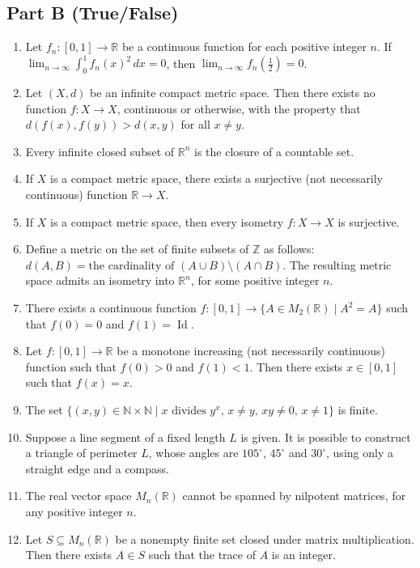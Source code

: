 \documentclass[11pt, a4paper]{article}
\begin{document}
\subsection*{Part B (True/False)}
\begin{enumerate}
  \item Let $f_n: [0,1] \to \mathbb{R}$ be a continuous function for each positive integer $n$. If $\lim_{n \to \infty} \int_0^1 f_n(x)^2\,dx = 0$, then $\lim_{n \to \infty} f_n\left(\frac{1}{2}\right) = 0$.
  \item Let $(X, d)$ be an infinite compact metric space. Then there exists no function $f: X \to X$, continuous or otherwise, with the property that $d(f(x), f(y)) > d(x, y)$ for all $x \ne y$.
  \item Every infinite closed subset of $\mathbb{R}^n$ is the closure of a countable set.
  \item If $X$ is a compact metric space, there exists a surjective (not necessarily continuous) function $\mathbb{R} \to X$.
  \item If $X$ is a compact metric space, then every isometry $f: X \to X$ is surjective.
  \item Define a metric on the set of finite subsets of $\mathbb{Z}$ as follows: $d(A, B) = \text{the cardinality of } (A \cup B) \setminus (A \cap B)$. The resulting metric space admits an isometry into $\mathbb{R}^n$, for some positive integer $n$.
  \item There exists a continuous function $f: [0,1] \to \{A \in M_2(\mathbb{R}) \mid A^2 = A\}$ such that $f(0) = 0$ and $f(1) = \operatorname{Id}$.
  \item Let $f: [0,1] \to \mathbb{R}$ be a monotone increasing (not necessarily continuous) function such that $f(0) > 0$ and $f(1) < 1$. Then there exists $x \in [0,1]$ such that $f(x) = x$.
  \item The set $\{(x, y) \in \mathbb{N} \times \mathbb{N} \mid x \text{ divides } y^x, \, x \ne y, \, xy \ne 0, \, x \ne 1\}$ is finite.
  \item Suppose a line segment of a fixed length $L$ is given. It is possible to construct a triangle of perimeter $L$, whose angles are $105^\circ$, $45^\circ$ and $30^\circ$, using only a straight edge and a compass.
  \item The real vector space $M_n(\mathbb{R})$ cannot be spanned by nilpotent matrices, for any positive integer $n$.
  \item Let $S \subseteq M_n(\mathbb{R})$ be a nonempty finite set closed under matrix multiplication. Then there exists $A \in S$ such that the trace of $A$ is an integer.

\end{enumerate}
\end{document}
